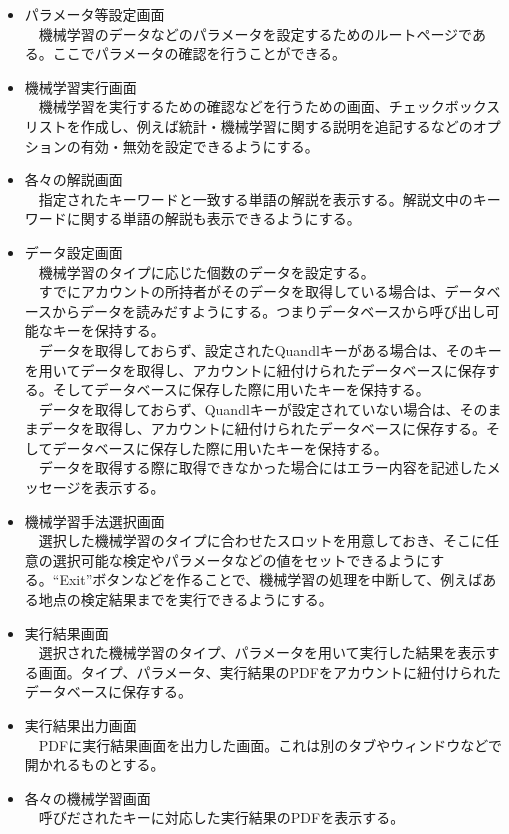 \documentclass{scrartcl}
\begin{document}
\begin{itemize}
\item パラメータ等設定画面\\
　機械学習のデータなどのパラメータを設定するためのルートページである。ここでパラメータの確認を行うことができる。\\
\item 機械学習実行画面\\
　機械学習を実行するための確認などを行うための画面、チェックボックスリストを作成し、例えば統計・機械学習に関する説明を追記するなどのオプションの有効・無効を設定できるようにする。\\
\item 各々の解説画面\\
　指定されたキーワードと一致する単語の解説を表示する。解説文中のキーワードに関する単語の解説も表示できるようにする。\\
\item データ設定画面\\
　機械学習のタイプに応じた個数のデータを設定する。\\
　すでにアカウントの所持者がそのデータを取得している場合は、データベースからデータを読みだすようにする。つまりデータベースから呼び出し可能なキーを保持する。\\
　データを取得しておらず、設定されたQuandlキーがある場合は、そのキーを用いてデータを取得し、アカウントに紐付けられたデータベースに保存する。そしてデータベースに保存した際に用いたキーを保持する。\\
　データを取得しておらず、Quandlキーが設定されていない場合は、そのままデータを取得し、アカウントに紐付けられたデータベースに保存する。そしてデータベースに保存した際に用いたキーを保持する。\\
　データを取得する際に取得できなかった場合にはエラー内容を記述したメッセージを表示する。\\
\item 機械学習手法選択画面\\
　選択した機械学習のタイプに合わせたスロットを用意しておき、そこに任意の選択可能な検定やパラメータなどの値をセットできるようにする。``Exit''ボタンなどを作ることで、機械学習の処理を中断して、例えばある地点の検定結果までを実行できるようにする。\\
\item 実行結果画面\\
　選択された機械学習のタイプ、パラメータを用いて実行した結果を表示する画面。タイプ、パラメータ、実行結果のPDFをアカウントに紐付けられたデータベースに保存する。\\
\item 実行結果出力画面\\
　PDFに実行結果画面を出力した画面。これは別のタブやウィンドウなどで開かれるものとする。\\
\item 各々の機械学習画面\\
　呼びだされたキーに対応した実行結果のPDFを表示する。\\
\end{itemize}
\end{document}
